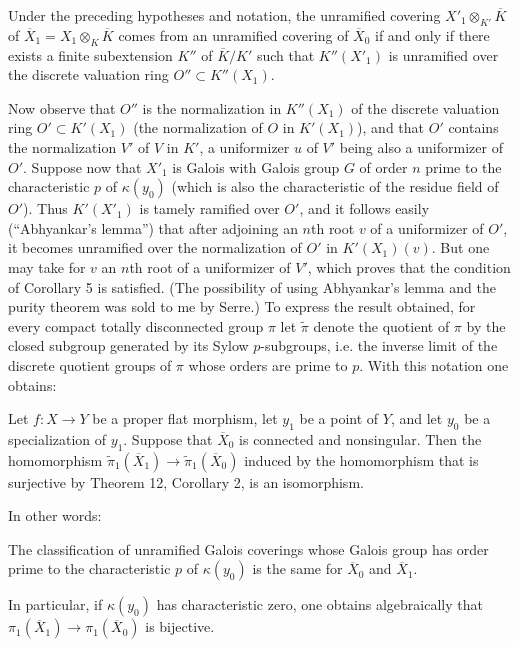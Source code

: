  Under the preceding hypotheses and notation, the
unramified covering $X'_1\otimes_{K'}\overline K$ of
$\overline X_1=X_1\otimes_K\overline K$ comes from an unramified covering of
$\overline X_0$ if and only if there exists a finite subextension $K''$ of
$\overline K/K'$ such that $K''(X'_1)$ is unramified over the discrete
valuation ring $O''\subset K''(X_1)$.

Now observe that $O''$ is the normalization in $K''(X_1)$ of the discrete
valuation ring $O'\subset K'(X_1)$ (the normalization of $O$ in $K'(X_1)$),
and that $O'$ contains the normalization $V'$ of $V$ in $K'$, a uniformizer
$u$ of $V'$ being also a uniformizer of $O'$. Suppose now that $X'_1$ is
Galois with Galois group $G$ of order $n$ prime to the characteristic $p$ of
$\kappa(y_0)$ (which is also the characteristic of the residue field of
$O'$). Thus $K'(X'_1)$ is tamely ramified over $O'$, and it follows easily
(“Abhyankar's lemma”) that after adjoining an $n$th root $v$ of a uniformizer
of $O'$, it becomes unramified over the normalization of $O'$ in
$K'(X_1)(v)$. But one may take for $v$ an $n$th root of a uniformizer of $V'$,
which proves that the condition of Corollary 5 is satisfied. (The possibility
of using Abhyankar's lemma and the purity theorem was sold to me by Serre.) To
express the result obtained, for every compact totally disconnected group
$\pi$ let $\widetilde\pi$ denote the quotient of $\pi$ by the closed subgroup
generated by its Sylow $p$-subgroups, i.e. the inverse limit of the discrete
quotient groups of $\pi$ whose orders are prime to $p$. With this notation one
obtains:

 Let $f:X\longrightarrow Y$ be a proper flat morphism,
let $y_1$ be a point of $Y$, and let $y_0$ be a specialization of $y_1$.
Suppose that $\overline X_0$ is connected and nonsingular. Then the
homomorphism
$\widetilde\pi_1(\overline X_1)\longrightarrow
\widetilde\pi_1(\overline X_0)$ induced by the homomorphism that is surjective
by Theorem 12, Corollary 2, is an isomorphism.

In other words:

 The classification of unramified Galois coverings whose
Galois group has order prime to the characteristic $p$ of $\kappa(y_0)$ is the
same for $\overline X_0$ and $\overline X_1$.

In particular, if $\kappa(y_0)$ has characteristic zero, one obtains
algebraically that
$\pi_1(\overline X_1)\longrightarrow\pi_1(\overline X_0)$ is bijective.

